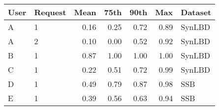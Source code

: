 \begin{tabular}{llrrrrl}
  \toprule
User & Request & Mean & 75th & 90th & Max & Dataset \\ 
  \midrule
A & 1 & 0.16 & 0.25 & 0.72 & 0.89 & SynLBD \\ 
  A & 2 & 0.10 & 0.00 & 0.52 & 0.92 & SynLBD \\ 
  B & 1 & 0.87 & 1.00 & 1.00 & 1.00 & SynLBD \\ 
  C & 1 & 0.22 & 0.51 & 0.72 & 0.99 & SynLBD \\ 
  D & 1 & 0.49 & 0.79 & 0.87 & 0.98 & SSB \\ 
  E & 1 & 0.39 & 0.56 & 0.63 & 0.94 & SSB \\ 
   \bottomrule
\end{tabular}
